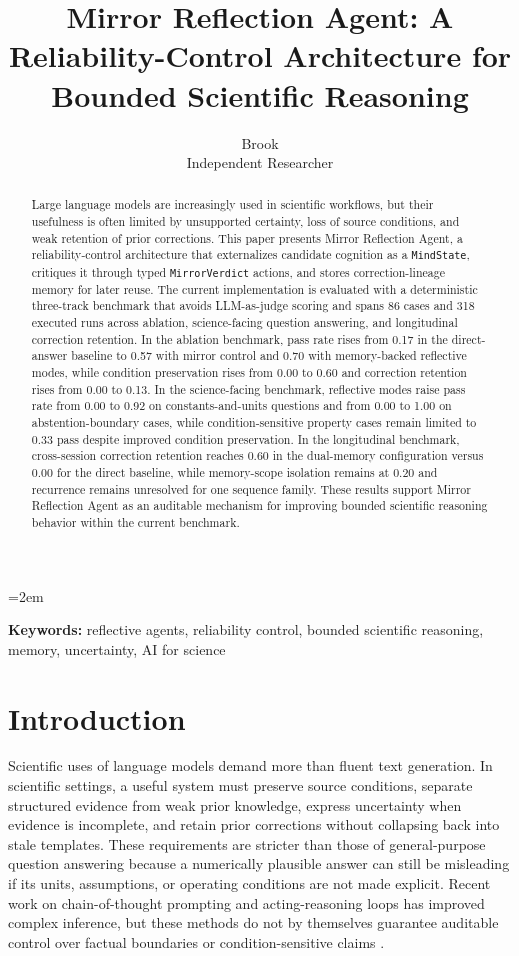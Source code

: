 \documentclass[12pt]{article}
\title{\textbf{Mirror Reflection Agent: A Reliability-Control Architecture for Bounded Scientific Reasoning}}
\author{Brook \\ Independent Researcher}
\date{}
\begin{document}
\maketitle
\onehalfspacing
\emergencystretch=2em

\begin{abstract}
Large language models are increasingly used in scientific workflows, but their usefulness is often limited by unsupported certainty, loss of source conditions, and weak retention of prior corrections. This paper presents Mirror Reflection Agent, a reliability-control architecture that externalizes candidate cognition as a \texttt{MindState}, critiques it through typed \texttt{MirrorVerdict} actions, and stores correction-lineage memory for later reuse. The current implementation is evaluated with a deterministic three-track benchmark that avoids LLM-as-judge scoring and spans 86 cases and 318 executed runs across ablation, science-facing question answering, and longitudinal correction retention. In the ablation benchmark, pass rate rises from 0.17 in the direct-answer baseline to 0.57 with mirror control and 0.70 with memory-backed reflective modes, while condition preservation rises from 0.00 to 0.60 and correction retention rises from 0.00 to 0.13. In the science-facing benchmark, reflective modes raise pass rate from 0.00 to 0.92 on constants-and-units questions and from 0.00 to 1.00 on abstention-boundary cases, while condition-sensitive property cases remain limited to 0.33 pass despite improved condition preservation. In the longitudinal benchmark, cross-session correction retention reaches 0.60 in the dual-memory configuration versus 0.00 for the direct baseline, while memory-scope isolation remains at 0.20 and recurrence remains unresolved for one sequence family. These results support Mirror Reflection Agent as an auditable mechanism for improving bounded scientific reasoning behavior within the current benchmark.
\end{abstract}

\noindent\textbf{Keywords:} reflective agents, reliability control, bounded scientific reasoning, memory, uncertainty, AI for science

\section{Introduction}

Scientific uses of language models demand more than fluent text generation. In scientific settings, a useful system must preserve source conditions, separate structured evidence from weak prior knowledge, express uncertainty when evidence is incomplete, and retain prior corrections without collapsing back into stale templates. These requirements are stricter than those of general-purpose question answering because a numerically plausible answer can still be misleading if its units, assumptions, or operating conditions are not made explicit. Recent work on chain-of-thought prompting and acting-reasoning loops has improved complex inference, but these methods do not by themselves guarantee auditable control over factual boundaries or condition-sensitive claims \cite{cot,react,toolformer}.
\end{document}
